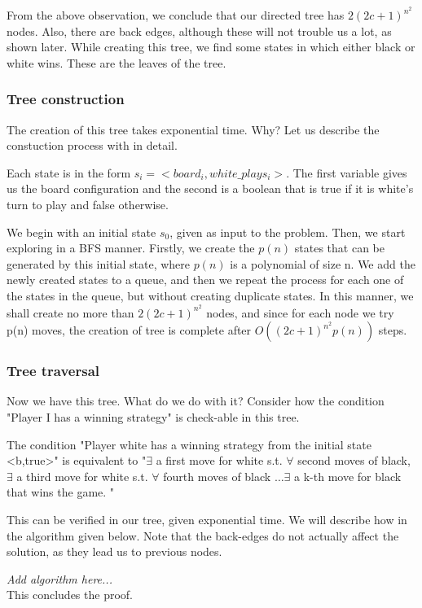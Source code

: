 From the above observation, we conclude that our directed tree has $2(2c+1)^{n^2}$ nodes. Also, there are back edges, although these will not trouble us a lot, as shown later. While 
creating this tree, we find some states in which either black or white 
wins. These are the leaves of the tree. 

\subsubsection*{Tree construction}
The creation of this tree takes exponential time. Why? Let us describe the 
constuction process with in detail.

Each state is in the form $s_i= <board_i, white\_plays_i>$. The first variable gives us the board configuration and 
the second is a boolean that is true if it is white's turn to play and false otherwise. 

We begin with an initial state $s_0$, given as input to the problem. Then, we start exploring in a BFS manner. Firstly, we 
create the $p(n)$ states that can be generated by this initial state, where $p(n)$ is a polynomial of size n. We add the newly
created states to a queue, and then we repeat the process for each one of the states in the queue, but without creating 
duplicate states. In this manner, we shall create no more than $2(2c+1)^{n^2}$ nodes, and since for each node we 
try p(n) moves, the creation of tree is complete after $O((2c+1)^{n^2}p(n))$ steps.
\subsubsection*{Tree traversal}
Now we have this tree. What do we do with it? Consider how the condition
"Player I has a winning strategy" is check-able in this tree.  

The condition "Player white has a winning strategy from the initial state 
<b,true>" is equivalent to "$\exists$ a first move for white s.t. $\forall$ second moves 
of black, $\exists$ a third move for white s.t. $\forall$ fourth moves of black
$\ldots \exists$ a k-th move for black that wins the game. "

This can be verified in our tree, given exponential time. We will describe how in the algorithm given below.
Note that the back-edges do not actually affect the solution, as they lead us to previous nodes.
\newline

\emph{Add algorithm here...} \\
This concludes the proof.


